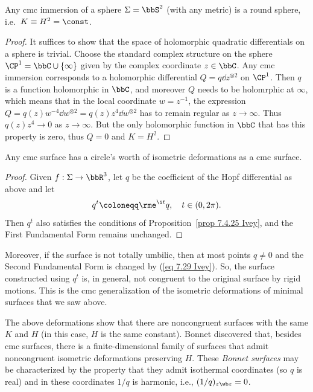 \begin{cor}[Hopf]
    Any \gls{cmc} immersion of a sphere $\Sigma=\bbS^2$ (with any metric) is a round sphere, i.e.~$K\equiv H^2=\const$.
\end{cor}
\begin{proof}
    It suffices to show that the space of holomorphic quadratic differentials on a sphere is trivial.
    Choose the standard complex structure on the sphere $\CP^1=\bbC\cup \{\infty\}$ given by the complex coordinate $z\in\bbC$. Any \gls{cmc} immersion corresponds to a holomorphic differential $Q=q\dd z^{\otimes 2}$ on $\CP^1$. Then $q$ is a function holomorphic in $\bbC$, and moreover $Q$ needs to be holomrphic at $\infty$, which means that in the local coordinate $w=z^{-1}$, the expression $Q=q(z)w^{-4}\dd w^{\otimes 2}=q(z)z^{4}\dd w^{\otimes 2}$ has to remain regular as $z\to \infty$. Thus $q(z)z^4\to 0$ as $z\to\infty$. But the only holomorphic function in $\bbC$ that has this property is zero, thus $Q=0$ and $K=H^2$.
\end{proof}


\begin{cor}
    Any \gls{cmc} surface has a circle's worth of isometric deformations as a \gls{cmc} surface.
\end{cor}
\begin{proof}
    Given $f:\Sigma\to \bbR^3$, let $q$ be the coefficient of the Hopf differential as above and let 
    \[q^t\coloneqq \rme^{\i t}q,\quad t\in(0,2\pi).\label{eq 7.29 Ivey}\]
    Then $q^t$ also satisfies the conditions of Proposition~\ref{prop 7.4.25 Ivey}, and the First Fundamental Form remains unchanged.
\end{proof}

Moreover, if the surface is not totally umbilic, then at most points $q\neq 0$ and the Second Fundamental Form is changed by (\ref{eq 7.29 Ivey}). So, the surface constructed using $q^t$ is, in general, not congruent to the original surface by rigid motions. This is the \gls{cmc} generalization of the isometric deformations of minimal surfaces that we saw above.

\begin{rem}
    The above deformations show that there are noncongruent surfaces with the same $K$ and $H$ (in this case, $H$ is the same constant). Bonnet discovered that, besides \gls{cmc} surfaces, there is a finite-dimensional family of surfaces that admit noncongruent isometric deformations preserving $H$. These \emph{Bonnet surfaces} may be characterized by the property that they admit isothermal coordinates (so $q$ is real) and in these coordinates $1/q$ is harmonic, i.e., $(1/q)_{z\wb z}=0$.
\end{rem}










